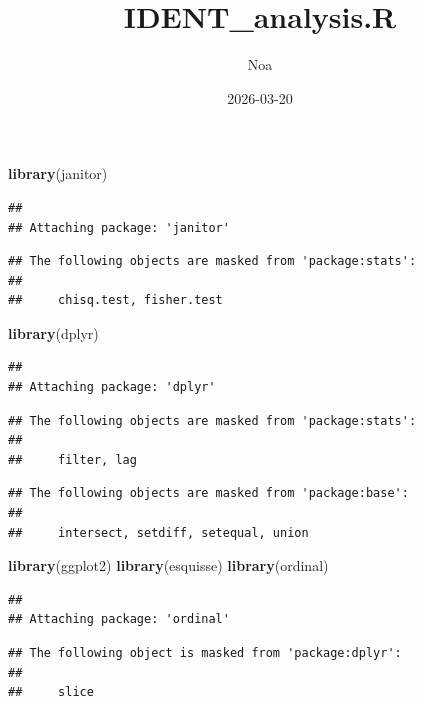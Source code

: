 \documentclass[
]{article}
\title{IDENT\_analysis.R}
\author{Noa}
\date{2026-03-20}
\newenvironment{Shaded}{\begin{snugshade}}{\end{snugshade}}
\newcommand{\FunctionTok}[1]{\textcolor[rgb]{0.13,0.29,0.53}{\textbf{#1}}}
\newcommand{\NormalTok}[1]{#1}
\begin{document}
\maketitle

\begin{Shaded}
\begin{Highlighting}[]
\FunctionTok{library}\NormalTok{(janitor)                       }
\end{Highlighting}
\end{Shaded}

\begin{verbatim}
## 
## Attaching package: 'janitor'
\end{verbatim}

\begin{verbatim}
## The following objects are masked from 'package:stats':
## 
##     chisq.test, fisher.test
\end{verbatim}

\begin{Shaded}
\begin{Highlighting}[]
\FunctionTok{library}\NormalTok{(dplyr)}
\end{Highlighting}
\end{Shaded}

\begin{verbatim}
## 
## Attaching package: 'dplyr'
\end{verbatim}

\begin{verbatim}
## The following objects are masked from 'package:stats':
## 
##     filter, lag
\end{verbatim}

\begin{verbatim}
## The following objects are masked from 'package:base':
## 
##     intersect, setdiff, setequal, union
\end{verbatim}

\begin{Shaded}
\begin{Highlighting}[]
\FunctionTok{library}\NormalTok{(ggplot2)}
\FunctionTok{library}\NormalTok{(esquisse)}
\FunctionTok{library}\NormalTok{(ordinal)}
\end{Highlighting}
\end{Shaded}

\begin{verbatim}
## 
## Attaching package: 'ordinal'
\end{verbatim}

\begin{verbatim}
## The following object is masked from 'package:dplyr':
## 
##     slice
\end{verbatim}
\end{document}

